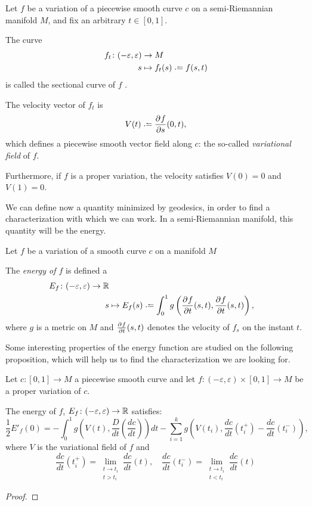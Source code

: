 \begin{definition}
	Let $f$ be a variation of a piecewise smooth curve $c$ on a semi-Riemannian manifold $M$, and fix an arbitrary $t \in [0,1]$.
	
	The curve
	\begin{align*}
		f_t \colon (-\varepsilon, \varepsilon) &\to M \\
		s &\mapsto f_t(s) \defeq f(s,t)
	\end{align*}
is called the sectional curve of $f$ .
\end{definition}

The velocity vector of $f_t$ is
\[
V(t) \defeq \pd{f}{s}(0,t),
\]
which defines a piecewise smooth vector field along $c$: the so-called \emph{variational field} of $f$.

Furthermore, if $f$ is a proper variation, the velocity satisfies $V(0) = 0$ and $V(1) = 0$.

We can define now a quantity minimized by geodesics, in order to find a characterization with which we can work. In a semi-Riemannian manifold, this quantity will be the energy.

\begin{definition}
	Let $f$ be a variation of a smooth curve $c$ on a manifold $M$
	
	The \emph{energy of $f$} is defined a
	\begin{align*}
		E_f \colon (-\varepsilon, \varepsilon) \to \R \\
		s &\mapsto E_f(s) \defeq \int_0^1 g \left( \pd{f}{t}(s,t), \pd{f}{t}(s,t) \right),
	\end{align*}
	where $g$ is a metric on $M$ and $\frac{\partial^{} f}{\partial t}(s,t)$ denotes the velocity of $f_s$ on the instant $t$.
\end{definition}

Some interesting properties of the energy function are studied on the following proposition, which will help us to find the characterization we are looking for.

\begin{proposition}
	\label{pro:energyprop}
	Let $c \colon [0,1] \to M$ a piecewise smooth curve and let $f \colon (-\varepsilon, \varepsilon) \times [0,1] \to M$ be a proper variation of $c$.
	
	The energy of $f$, $E_f \colon (-\varepsilon, \varepsilon) \to \mathbb{R}$ satisfies:
	\[
		\frac{1}{2} E'_f(0) = - \int_0^1 g\left( V(t), \frac{D}{dt}\left(\frac{dc}{dt}\right) \right)dt - \sum_{i=1}^k g \left( V(t_i), \frac{dc}{dt}(t_i^+) - \frac{dc}{dt}(t_i^-) \right),
	\]
	where $V$ is the variational field of $f$ and
	\[
		\frac{dc}{dt}(t_i^+) = \lim_{\substack{t \to t_i \\ t > t_i}} \frac{dc}{dt}(t), \quad \frac{dc}{dt}(t_i^-) = \lim_{\substack{t \to t_i \\ t < t_i}} \frac{dc}{dt}(t)
	\]
\end{proposition}
\begin{proof}
\end{proof}

